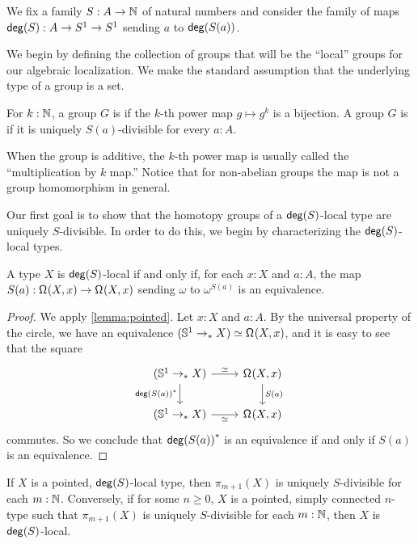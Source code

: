 We fix a family $S : A \to \mathbb{N}$ of natural numbers and consider the family
of maps $\mathsf{deg}(S) : A \to S^1 \to S^1$ sending $a$ to $\mathsf{deg}(S(a))$.

We begin by defining the collection of groups that will be the
``local'' groups for our algebraic localization.
We make the standard assumption that the underlying type of a group is a set.

\begin{defn}
    For $k : \mathbb{N}$, a group $G$ is  if the $k$-th power map
    $g \mapsto g^k$ is a bijection.
    A group $G$ is  if it is uniquely $S(a)$-divisible for every $a : A$.
\end{defn}

When the group is additive, the $k$-th power map is usually called the ``multiplication by $k$ map.''
Notice that for non-abelian groups the map is not a group homomorphism in general.

Our first goal is to show that the homotopy groups of a $\mathsf{deg}(S)$-local type
are uniquely $S$-divisible.
In order to do this, we begin by characterizing the $\mathsf{deg}(S)$-local types.

\begin{lem}
A type $X$ is $\mathsf{deg}(S)$-local if and only if, for each $x:X$ and $a:A$, the map
$S(a) : \mathsf{\Omega}^{}(X,x) \to \mathsf{\Omega}^{}(X,x)$ sending 
$\omega$ to $\omega^{S(a)}$ is an equivalence.
\end{lem}

\begin{proof}
We apply \cref{lemma:pointed}.
Let $x:X$ and $a:A$.
By the universal property of the circle, we have an equivalence
$(\mathbb{S}^{1} \to_{\ast} X) \simeq \mathsf{\Omega}^{}(X,x)$,
and it is easy to see that the square
\[
  \begin{tikzcd}
    (\sphere{1} \pto X) \arrow[r,"\simeq"] \arrow[d,swap,"\precomp{\degg(S(a))}"] & \loopspace{X,x} \arrow[d,"S(a)"] \\
    (\sphere{1} \pto X) \arrow[r,swap,"\simeq"] & \loopspace{X,x}
  \end{tikzcd}
\]
commutes.
So we conclude that ${\mathsf{deg}(S(a))}^\ast$ is an equivalence if and only if $S(a)$ is an equivalence.
\end{proof}

\begin{prp}\label{prop:homotopygroupsoflocalarelocal}
    If $X$ is a pointed, $\mathsf{deg}(S)$-local type, then $\pi_{m+1}(X)$ is uniquely $S$-divisible
    for each $m : \mathbb{N}$.
    Conversely, if for some $n \geq 0$, $X$ is a pointed, simply connected $n$-type
    such that $\pi_{m+1}(X)$ is uniquely $S$-divisible for each $m : \mathbb{N}$,
    then $X$ is $\mathsf{deg}(S)$-local.
\end{prp}

